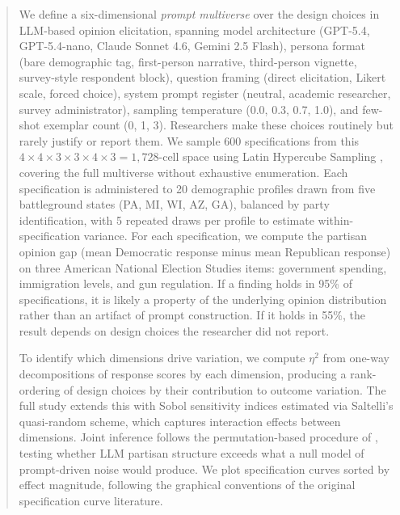\documentclass[10pt]{article}
\begin{document}
\begin{abstract}
We define a six-dimensional \textit{prompt multiverse} over the design choices in LLM-based opinion elicitation, spanning model architecture (GPT-5.4, GPT-5.4-nano, Claude Sonnet 4.6, Gemini 2.5 Flash), persona format (bare demographic tag, first-person narrative, third-person vignette, survey-style respondent block), question framing (direct elicitation, Likert scale, forced choice), system prompt register (neutral, academic researcher, survey administrator), sampling temperature (0.0, 0.3, 0.7, 1.0), and few-shot exemplar count (0, 1, 3). Researchers make these choices routinely but rarely justify or report them. We sample 600 specifications from this $4 \times 4 \times 3 \times 3 \times 4 \times 3 = 1{,}728$-cell space using Latin Hypercube Sampling \cite{mckay1979comparison}, covering the full multiverse without exhaustive enumeration. Each specification is administered to 20 demographic profiles drawn from five battleground states (PA, MI, WI, AZ, GA), balanced by party identification, with 5 repeated draws per profile to estimate within-specification variance. For each specification, we compute the partisan opinion gap (mean Democratic response minus mean Republican response) on three American National Election Studies items: government spending, immigration levels, and gun regulation. If a finding holds in 95\% of specifications, it is likely a property of the underlying opinion distribution rather than an artifact of prompt construction. If it holds in 55\%, the result depends on design choices the researcher did not report.

To identify which dimensions drive variation, we compute $\eta^2$ from one-way decompositions of response scores by each dimension, producing a rank-ordering of design choices by their contribution to outcome variation. The full study extends this with Sobol sensitivity indices \cite{saltelli2008global} estimated via Saltelli's quasi-random scheme, which captures interaction effects between dimensions. Joint inference follows the permutation-based procedure of \cite{simonsohn2020specification}, testing whether LLM partisan structure exceeds what a null model of prompt-driven noise would produce. We plot specification curves sorted by effect magnitude, following the graphical conventions of the original specification curve literature.


\end{abstract}
\end{document}
